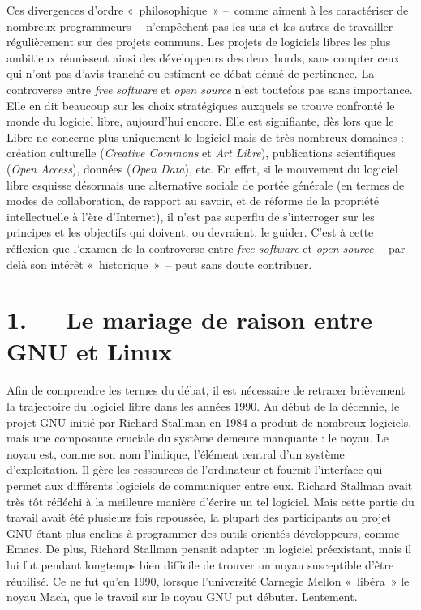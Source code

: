 \documentclass{FramateX}
\begin{document}
\begin{refsection}
Ces divergences d'ordre «~philosophique~» –~comme
aiment à les caractériser de nombreux programmeurs~–
n'empêchent pas les uns et les autres de travailler
régulièrement sur des projets communs. Les projets de logiciels libres
les plus ambitieux réunissent ainsi des développeurs des deux bords,
sans compter ceux qui n'ont pas d'avis tranché ou estiment ce débat
dénué de pertinence. La controverse entre \textit{free software} et
\textit{open source} n'est toutefois pas sans
importance. Elle en dit beaucoup sur les choix stratégiques
auxquels se trouve confronté le monde du logiciel libre,
aujourd'hui encore. Elle est signifiante, dès lors
que le Libre ne concerne plus uniquement le logiciel mais de très
nombreux domaines : création culturelle (\textit{Creative Commons} et
\textit{Art Libre}), publications scientifiques (\textit{Open
Access}), données (\textit{Open Data}), etc. En effet, si le mouvement
du logiciel libre esquisse désormais une alternative sociale de portée
générale (en termes de modes de collaboration, de rapport au savoir, et
de réforme de la propriété intellectuelle à l'ère
d'Internet), il n'est pas superflu de
s'interroger sur les principes et les objectifs qui
doivent, ou devraient, le guider. C'est à cette
réflexion que l'examen de la controverse entre
\textit{free software} et \textit{open source} –~par-delà son intérêt
«~historique~»~– peut sans doute contribuer.



\section*{1.~~~Le mariage de raison entre GNU et Linux}
{}

Afin de comprendre les termes du débat, il est nécessaire de retracer
brièvement la trajectoire du logiciel libre dans les années 1990. Au
début de la décennie, le projet GNU initié par Richard Stallman en 1984
a produit de nombreux logiciels, mais une composante cruciale du
système demeure manquante : le noyau. Le noyau est, comme son nom
l'indique, l'élément central d'un système d'exploitation. Il gère les
ressources de l'ordinateur et fournit l'interface qui permet aux
différents logiciels de communiquer entre eux. Richard Stallman avait
très tôt réfléchi à la meilleure manière d'écrire un tel logiciel. Mais
cette partie du travail avait été plusieurs fois repoussée, la plupart
des participants au projet GNU étant plus enclins à programmer des
outils orientés développeurs, comme Emacs. De plus, Richard Stallman
pensait adapter un logiciel préexistant, mais il lui fut pendant
longtemps bien difficile de trouver un noyau susceptible d'être
réutilisé. Ce ne fut qu'en 1990, lorsque l'université Carnegie Mellon
«~libéra~» le noyau Mach, que le travail sur le noyau GNU put débuter.
Lentement.


\end{refsection}
\end{document}
